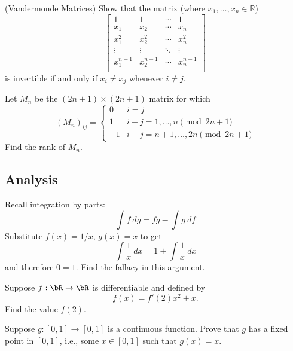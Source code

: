 \documentclass[12pt]{article}
\begin{document}
            \begin{exercise}
            (Vandermonde Matrices) Show that the matrix (where $x_{1}, \ldots, x_{n} \in \mathbb{R}$)
            \[\begin{bmatrix}
            1&1&\cdots&1\\
            x_{1}&x_{2}&\cdots&x_{n}\\
            x_{1}^{2}&x_{2}^{2}&\cdots&x_{n}^{2}\\
            \vdots&\vdots&\ddots&\vdots\\
            x_{1}^{n - 1}&x_{2}^{n - 1}&\cdots&x_{n}^{n - 1}\\
            \end{bmatrix}
            \]
            is invertible if and only if $x_{i} \neq x_{j}$ whenever $i \neq j$. 
            \end{exercise}

            \begin{exercise}
                Let $M_n$ be the $(2n+1)\times (2n+1)$ matrix for which \[(M_n)_{ij}=\begin{cases} 0 & i=j \\
                1 & i-j=1,\dots,n \pmod{2n+1} \\ -1 & i-j=n+1,\dots,2n \pmod{2n+1}\end{cases}\] Find the rank of $M_n$.
            \end{exercise}

    \subsection{Analysis}

        \begin{exercise}
            Recall integration by parts:
            \[ \int f\ dg = fg- \int g\ df\] Substitute $f(x)=1/x$, $g(x)=x$ to get
            \[\int \frac{1}{x}\ dx = 1+ \int \frac{1}{x}\ dx\] and therefore $0=1$. Find the fallacy in this argument.
        \end{exercise}

        \begin{exercise}
            Suppose \(f:\bR\to\bR\) is differentiable and defined by
            \[f(x) = f'(2)x^2 + x.\]
            Find the value \(f(2)\).
        \end{exercise}

        \begin{exercise}
            Suppose $g:[0,1]\to [0,1]$ is a continuous function. Prove that $g$ has a fixed point in $[0,1]$, i.e., some $x\in [0,1]$ such that $g(x)=x$.
        \end{exercise}
            
\end{document}
